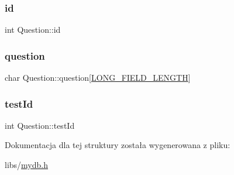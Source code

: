 \mbox{\label{structQuestion_ab7a4a82dd8625e50c247670c41bdfe23}} 
\subsubsection{\texorpdfstring{id}{id}}
{\footnotesize\ttfamily int Question\+::id}

\mbox{\label{structQuestion_af1123680bf154eb00454fe9872f0e9b5}} 
\subsubsection{\texorpdfstring{question}{question}}
{\footnotesize\ttfamily char Question\+::question\mbox{[}\mbox{\hyperlink{mydb_8h_acb932076e71b8c1d0658cc6c33043cb3}{L\+O\+N\+G\+\_\+\+F\+I\+E\+L\+D\+\_\+\+L\+E\+N\+G\+TH}}\mbox{]}}

\mbox{\label{structQuestion_ad0cf3ed6dd2784d1a18116aaf19700df}} 
\subsubsection{\texorpdfstring{testId}{testId}}
{\footnotesize\ttfamily int Question\+::test\+Id}



Dokumentacja dla tej struktury została wygenerowana z pliku\+:\begin{DoxyCompactItemize}
\item 
libs/\mbox{\hyperlink{mydb_8h}{mydb.\+h}}\end{DoxyCompactItemize}
